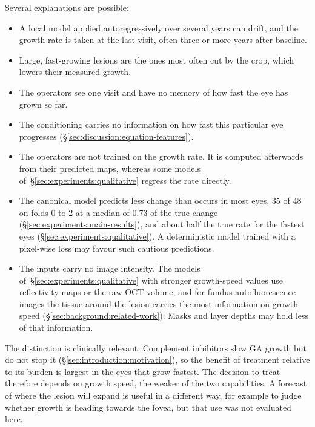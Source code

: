 Several explanations are possible:
\begin{itemize}
  \item A local model applied autoregressively over several years can
    drift, and the growth rate is taken at the last visit, often three or
    more years after baseline.
  \item Large, fast-growing lesions are the ones most often cut by the
    crop, which lowers their measured growth.
  \item The operators see one visit and have no memory of how fast the eye
    has grown so far.
  \item The conditioning carries no information on how fast this
    particular eye progresses (\S\ref{sec:discussion:equation-features}).
  \item The operators are not trained on the growth rate. It is computed
    afterwards from their predicted maps, whereas some models
    of~\S\ref{sec:experiments:qualitative} regress the rate directly.
  \item The canonical model predicts less change than occurs in most
    eyes, 35 of 48 on folds 0 to 2 at a median of 0.73 of the true change
    (\S\ref{sec:experiments:main-results}), and about half the true rate
    for the fastest eyes (\S\ref{sec:experiments:qualitative}). A
    deterministic model trained with a pixel-wise loss may favour such
    cautious predictions.
  \item The inputs carry no image intensity. The models
    of~\S\ref{sec:experiments:qualitative} with stronger growth-speed
    values use reflectivity maps or the raw OCT volume, and for fundus
    autofluorescence images the tissue around the lesion carries the most
    information on growth speed (\S\ref{sec:background:related-work}).
    Masks and layer depths may hold less of that information.
\end{itemize}

The distinction is clinically relevant. Complement inhibitors slow GA
growth but do not stop it (\S\ref{sec:introduction:motivation}), so the
benefit of treatment relative to its burden is largest in the eyes that
grow fastest. The decision to treat therefore depends on growth speed, the
weaker of the two capabilities. A forecast of where the lesion will expand is useful in
a different way, for example to judge whether growth is heading towards
the fovea, but that use was not evaluated here.

